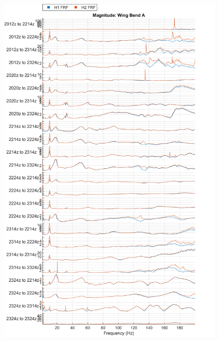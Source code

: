\begin{figure}[H]
    \centering
    \includegraphics{figs/GVT/mag_Wing Bend A.png}
    \label{fig:mag_wingBendA}
\end{figure}
